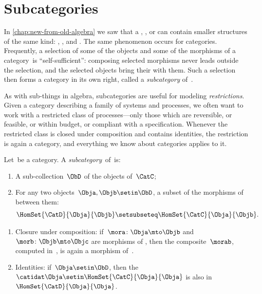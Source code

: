 

\section{Subcategories}
\label{sec:subcategories}


In \cref{chap:new-from-old-algebra} we saw that a , , or  can contain smaller structures of the same kind: , , and .
The same phenomenon occurs for categories.
Frequently, a selection of some of the objects and some of the morphisms of a category~\CatC is ``self-sufficient'': composing selected morphisms never leads outside the selection, and the selected objects bring their  with them.
Such a selection then forms a category in its own right, called a \emph{subcategory} of~\CatC.

As with sub-things in algebra, subcategories are useful for modeling \emph{restrictions}.
Given a category describing a family of systems and processes, we often want to work with a restricted class of processes---only those which are reversible, or feasible, or within budget, or compliant with a specification.
Whenever the restricted class is closed under composition and contains identities, the restriction is again a category, and everything we know about categories applies to it.

\begin{ctdefinition}[Subcategory]
    \label{def:subcategory}
    Let~\CatC be a category.
    A \emph{subcategory}~\CatD of~\CatC is:

    \constit

    \begin{enumerate}
        \item A sub-collection~$\ObD$ of the objects of~$\CatC$;
        \item For any two objects~$\Obja,\Objb\setin \ObD$, a subset of the morphisms of \CatC between them:
              \begin{equation}
                  \HomSet{\CatD}{\Obja}{\Objb}\setsubseteq \HomSet{\CatC}{ \Obja}{\Objb}.
              \end{equation}
    \end{enumerate}

    \condit

    \begin{enumerate}
        \item Closure under composition: if~$\mora \colon \Obja \mto \Objb$ and~$\morb\colon \Objb\mto \Objc$ are morphisms of \CatD, then the composite~$\morab$, computed in~\CatC, is again a morphism of~\CatD.
        \item Identities: if~$\Obja\setin \ObD$, then the  $\catidat\Obja \setin \HomSet{\CatC}{\Obja}{\Obja}$ is also in~$\HomSet{\CatD}{\Obja}{\Obja}$.
    \end{enumerate}
\end{ctdefinition}

